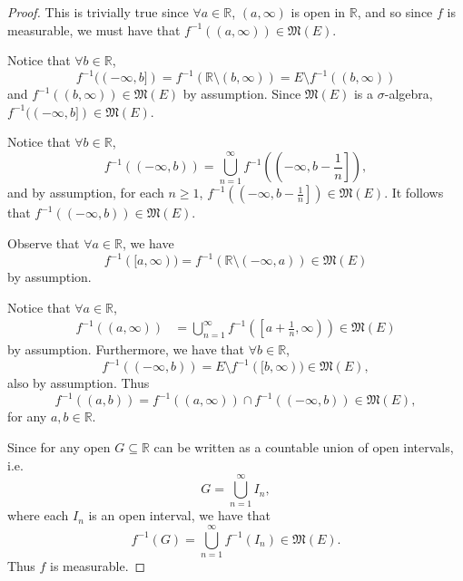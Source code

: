 \documentclass[notoc,notitlepage]{tufte-book}
\begin{document}
\begin{proof}
   This is trivially true since $\forall a \in
  \mathbb{R}$, $(a, \infty)$ is open in $\mathbb{R}$, and so since $f$ is
  measurable, we must have that $f^{-1}((a, \infty)) \in \mathfrak{M}(E)$.

  \noindent
   Notice that $\forall b \in \mathbb{R}$,
  \begin{equation*}
    f^{-1}((-\infty, b]) = f^{-1}(\mathbb{R} \setminus (b, \infty)) = E
    \setminus f^{-1}((b, \infty))
  \end{equation*}
  and $f^{-1}((b, \infty)) \in \mathfrak{M}(E)$ by assumption. Since
  $\mathfrak{M}(E)$ is a $\sigma$-algebra, $f^{-1}((-\infty, b]) \in
  \mathfrak{M}(E)$.

  \noindent
   Notice that $\forall b \in \mathbb{R}$,
  \begin{equation*}
    f^{-1}((-\infty, b)) = \bigcup_{n=1}^{\infty} f^{-1}\left(\left(-\infty, b -
      \frac{1}{n}\right]\right),
  \end{equation*}
  and by assumption, for each $n \geq 1$, $f^{-1}\left( \left( -\infty, b -
  \frac{1}{n} \right] \right) \in \mathfrak{M}(E)$. It follows that
  $f^{-1}((-\infty, b)) \in \mathfrak{M}(E)$.

  \noindent
   Observe that $\forall a \in \mathbb{R}$, we have
  \begin{equation*}
    f^{-1}([a, \infty)) = f^{-1}(\mathbb{R}\setminus(-\infty, a)) \in
    \mathfrak{M}(E)
  \end{equation*}
  by assumption.

  \noindent
   Notice that $\forall a \in
  \mathbb{R}$,
  \begin{align*}
    f^{-1}((a, \infty)) &= \bigcup_{n=1}^{\infty} f^{-1} \left( \left[ a +
    \frac{1}{n}, \infty \right) \right) \in \mathfrak{M}(E)
  \end{align*}
  by assumption. Furthermore, we have that $\forall b \in \mathbb{R}$,
  \begin{equation*}
    f^{-1}((-\infty, b)) = E \setminus f^{-1}([b, \infty)) \in \mathfrak{M}(E),
  \end{equation*}
  also by assumption. Thus
  \begin{equation*}
    f^{-1}((a, b)) = f^{-1}((a, \infty)) \cap f^{-1}((-\infty, b)) \in
    \mathfrak{M}(E),
  \end{equation*}
  for any $a, b \in \mathbb{R}$.

  Since for any open $G \subseteq \mathbb{R}$ can be written as a countable
  union of open intervals, i.e.
  \begin{equation*}
    G = \bigcup_{n=1}^{\infty} I_n,
  \end{equation*}
  where each $I_n$ is an open interval, we have that
  \begin{equation*}
    f^{-1}(G) = \bigcup_{n=1}^{\infty} f^{-1}(I_n) \in \mathfrak{M}(E).
  \end{equation*}
  Thus $f$ is measurable.
\end{proof}
\end{document}
